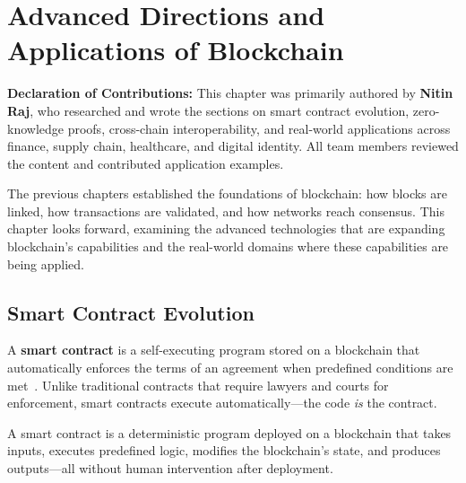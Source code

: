 \chapter{Advanced Directions and Applications of Blockchain}
\label{ch:applications}

\noindent\textbf{Declaration of Contributions:} This chapter was primarily authored by \textbf{Nitin Raj}, who researched and wrote the sections on smart contract evolution, zero-knowledge proofs, cross-chain interoperability, and real-world applications across finance, supply chain, healthcare, and digital identity. All team members reviewed the content and contributed application examples.

\bigskip

The previous chapters established the foundations of blockchain: how blocks are linked, how transactions are validated, and how networks reach consensus. This chapter looks forward, examining the advanced technologies that are expanding blockchain's capabilities and the real-world domains where these capabilities are being applied.

\section{Smart Contract Evolution}
\label{sec:smart-contracts}

A \textbf{smart contract} is a self-executing program stored on a blockchain that automatically enforces the terms of an agreement when predefined conditions are met~\cite{buterin2014ethereum, wood2014ethereum}. Unlike traditional contracts that require lawyers and courts for enforcement, smart contracts execute automatically---the code \emph{is} the contract.

\begin{definition}
\label{def:smart-contract}
A smart contract is a deterministic program deployed on a blockchain that takes inputs, executes predefined logic, modifies the blockchain's state, and produces outputs---all without human intervention after deployment.
\end{definition}

